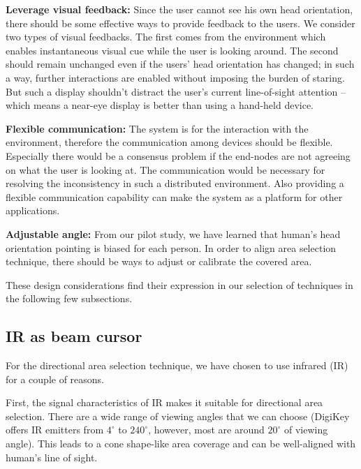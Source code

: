 {\bf Leverage visual feedback:} Since the user cannot see his own head orientation, there should be some effective ways to provide feedback to the users. We consider two types of visual feedbacks. The first comes from the environment which enables instantaneous visual cue while the user is looking around. The second should remain unchanged even if the users' head orientation has changed; in such a way, further interactions are enabled without imposing the burden of staring. But such a display shouldn't distract the user's current line-of-sight attention -- which means a near-eye display is better than using a hand-held device. 


{\bf Flexible communication:} The system is for the interaction with the environment, therefore the communication among devices should be flexible. Especially there would be a consensus problem if the end-nodes are not agreeing on what the user is looking at. The communication would be necessary for resolving the inconsistency in such a distributed environment. Also providing a flexible communication capability can make the system as a platform for other applications. 

{\bf Adjustable angle:} From our pilot study, we have learned that human's head orientation pointing is biased for each person. In order to align area selection technique, there should be ways to adjust or calibrate the covered area.

These design considerations find their expression in our selection of techniques in the following few subsections.

\subsection{IR as beam cursor}
\label{sec:ir-as-beam}

For the directional area selection technique, we have chosen to use infrared (IR) for a couple of reasons.  

First, the signal characteristics of IR makes it suitable for directional area selection. There are a wide range of viewing angles that we can choose (DigiKey offers IR emitters from $4^\circ$ to $240^\circ$, however, most are around $20^\circ$ of viewing angle). This leads to a cone shape-like area coverage and can be well-aligned with human's line of sight. 


